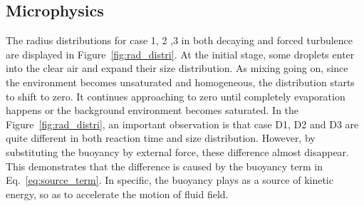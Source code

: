 \documentclass[12pt]{article}
\newcommand{\Eq}[1]{Eq.~\eqref{#1}} \newcommand{\Fig}[1]{Figure~\ref{#1}}
\begin{document}
\subsection{Microphysics}
The radius distributions for case 1, 2 ,3 in both decaying and forced turbulence are displayed in \Fig{fig:rad_distri}. At the initial stage, some droplets enter into the clear air and expand their size distribution. As mixing going on, since the environment becomes unsaturated and homogeneous, the distribution starts to shift to zero. It continues approaching to zero until completely evaporation happens or the background environment becomes saturated. 
In the \Fig{fig:rad_distri}, an important observation is that case D1, D2 and D3 are quite different in both reaction time and size distribution. However, by substituting the buoyancy by external force, these difference almost disappear. This demonstrates that the difference is caused by the buoyancy term in \Eq{eq:source_term}. In specific, the buoyancy plays as a source of kinetic energy, so as to accelerate the motion of fluid field.
\end{document}
